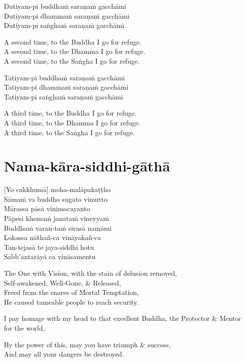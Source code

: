 Dutiyam-pi buddhaṁ saraṇaṁ gacchāmi\\
Dutiyam-pi dhammaṁ saraṇaṁ gacchāmi\\
Dutiyam-pi saṅghaṁ saraṇaṁ gacchāmi

\begin{english-verses}
  A second time, to the Buddha I go for refuge.\\
  A second time, to the Dhamma I go for refuge.\\
  A second time, to the Saṅgha I go for refuge.
\end{english-verses}

Tatiyam-pi buddhaṁ saraṇaṁ gacchāmi\\
Tatiyam-pi dhammaṁ saraṇaṁ gacchāmi\\
Tatiyam-pi saṅghaṁ saraṇaṁ gacchāmi

\begin{english-verses}
  A third time, to the Buddha I go for refuge.\\
  A third time, to the Dhamma I go for refuge.\\
  A third time, to the Saṅgha I go for refuge.
\end{english-verses}

\vspace{1em}

\section{Nama-kāra-siddhi-gāthā}
\label{nama-kara-siddhi-gatha}

\vspace{-0.6em}

[Yo cakkhumā] moha-malāpakaṭṭho\\
Sāmaṁ va buddho sugato vimutto\\
Mārassa pāsā vinimocayanto\\
Pāpesi khemaṁ janataṁ vineyyaṁ\\
Buddhaṁ varan-taṁ sirasā namāmi\\
Lokassa nāthañ-ca vināyakañ-ca\\
Tan-tejasā te jaya-siddhi hotu\\
Sabb'antarāyā ca vināsamentu

\begin{english-verses}
  The One with Vision, with the stain of delusion removed,\\
  Self-awakened, Well-Gone, \& Released,\\
  Freed from the snares of Mortal Temptation,\\
  He caused tameable people to reach security.\\
\begin{english-hangtogether-verses}
  I pay homage with my head to that excellent Buddha, the Protector \& Mentor for the world,\\
\end{english-hangtogether-verses}
  By the power of this, may you have triumph \& success,\\
  And may all your dangers be destroyed.
\end{english-verses}

